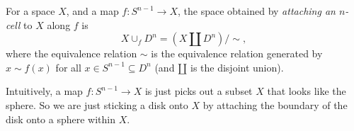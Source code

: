 \documentclass[a4paper]{article}
\begin{document}
\begin{defi}
  For a space $X$, and a map $f: S^{n - 1}\to X$, the space obtained by \emph{attaching an $n$-cell} to $X$ along $f$ is
  \[
    X\cup_{f}D^n = (X\amalg D^n)/{\sim},
  \]
  where the equivalence relation $\sim$ is the equivalence relation generated by $x\sim f(x)$ for all $x\in S^{n - 1}\subseteq D^n$ (and $\amalg$ is the disjoint union).

  Intuitively, a map $f: S^{n - 1}\to X$ is just picks out a subset $X$ that looks like the sphere. So we are just sticking a disk onto $X$ by attaching the boundary of the disk onto a sphere within $X$.
  \begin{center}
  \end{center}
\end{defi}
\end{document}
